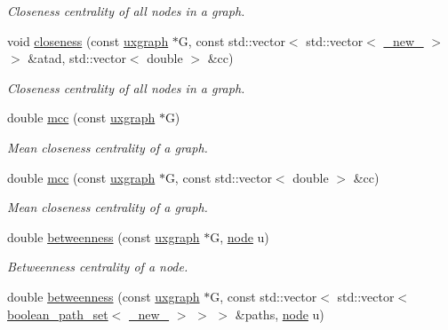 \begin{DoxyCompactItemize}
\begin{DoxyCompactList}\small\item\em Closeness centrality of all nodes in a graph. \end{DoxyCompactList}\item 
void \hyperlink{namespacelgraph_1_1networks_1_1metrics_1_1centralities_a56d2d61c30688914a57cc7a55733582d}{closeness} (const \hyperlink{classlgraph_1_1uxgraph}{uxgraph} $\ast$G, const std\+::vector$<$ std\+::vector$<$ \hyperlink{namespacelgraph_aa930092705699c3af78e3a4de7880a3f}{\+\_\+new\+\_\+} $>$ $>$ \&atad, std\+::vector$<$ double $>$ \&cc)
\begin{DoxyCompactList}\small\item\em Closeness centrality of all nodes in a graph. \end{DoxyCompactList}\item 
double \hyperlink{namespacelgraph_1_1networks_1_1metrics_1_1centralities_a3321a941646c6958c695198b1efcbe13}{mcc} (const \hyperlink{classlgraph_1_1uxgraph}{uxgraph} $\ast$G)
\begin{DoxyCompactList}\small\item\em Mean closeness centrality of a graph. \end{DoxyCompactList}\item 
double \hyperlink{namespacelgraph_1_1networks_1_1metrics_1_1centralities_add884e5cdd51eed7c46e064338361ee6}{mcc} (const \hyperlink{classlgraph_1_1uxgraph}{uxgraph} $\ast$G, const std\+::vector$<$ double $>$ \&cc)
\begin{DoxyCompactList}\small\item\em Mean closeness centrality of a graph. \end{DoxyCompactList}\item 
double \hyperlink{namespacelgraph_1_1networks_1_1metrics_1_1centralities_a0834cb72864b1bdf574c212c5cafbce9}{betweenness} (const \hyperlink{classlgraph_1_1uxgraph}{uxgraph} $\ast$G, \hyperlink{namespacelgraph_a397169dd66adf725210a30fb7251773e}{node} u)
\begin{DoxyCompactList}\small\item\em Betweenness centrality of a node. \end{DoxyCompactList}\item 
double \hyperlink{namespacelgraph_1_1networks_1_1metrics_1_1centralities_a9c5f210ed96ff6bcb1dfb45aaba3f947}{betweenness} (const \hyperlink{classlgraph_1_1uxgraph}{uxgraph} $\ast$G, const std\+::vector$<$ std\+::vector$<$ \hyperlink{namespacelgraph_afad432931ba600ab1628d5c9595986c5}{boolean\+\_\+path\+\_\+set}$<$ \hyperlink{namespacelgraph_aa930092705699c3af78e3a4de7880a3f}{\+\_\+new\+\_\+} $>$ $>$ $>$ \&paths, \hyperlink{namespacelgraph_a397169dd66adf725210a30fb7251773e}{node} u)

\end{DoxyCompactItemize}
